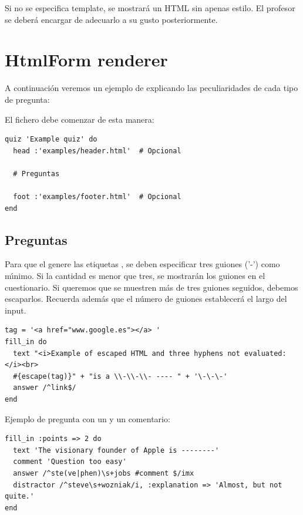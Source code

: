

Si no se especifica template, se mostrar\'a un HTML sin apenas estilo. El profesor se deber\'a encargar de adecuarlo a su gusto posteriormente. 

\section{HtmlForm renderer}
\label{Apendice2:htmlform}

A continuaci\'on veremos un ejemplo de  explicando las peculiaridades de cada tipo de pregunta:

El fichero  debe comenzar de esta manera:
\begin{verbatim}
quiz 'Example quiz' do
  head :'examples/header.html'  # Opcional
  
  # Preguntas
  
  foot :'examples/footer.html'  # Opcional
end
\end{verbatim}
\bigskip

\subsection{Preguntas }
\label{subsec:Apendice2.1}

Para que el  genere las etiquetas , se deben especificar tres guiones ('-') como m\'{\i}nimo. Si la cantidad es menor que tres, se mostrar\'an los guiones
en el cuestionario. Si queremos que se muestren m\'as de tres guiones seguidos, debemos escaparlos. Recuerda adem\'as que el n\'umero de guiones establecer\'a el largo del input.
\begin{verbatim}
tag = '<a href="www.google.es"></a> '
fill_in do
  text "<i>Example of escaped HTML and three hyphens not evaluated:</i><br> 
  #{escape(tag)}" + "is a \\-\\-\\- ---- " + '\-\-\-'
  answer /^link$/
end
\end{verbatim}
\bigskip

Ejemplo de pregunta con un  y un comentario:
\begin{verbatim}
fill_in :points => 2 do
  text 'The visionary founder of Apple is --------'
  comment 'Question too easy'
  answer /^ste(ve|phen)\s+jobs #comment $/imx
  distractor /^steve\s+wozniak/i, :explanation => 'Almost, but not quite.'
end
\end{verbatim}
\bigskip

